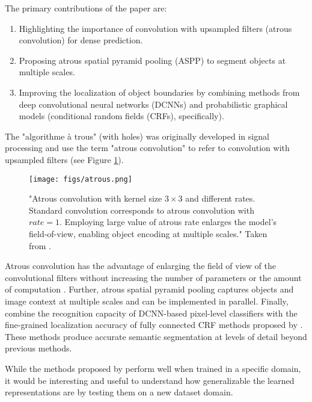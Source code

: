 \documentclass[10pt,twocolumn,letterpaper]{article}
\begin{document}
The primary contributions of the \citet{chen2018deeplab} paper are:
\begin{enumerate}
  \item Highlighting the importance of convolution with upsampled filters (atrous convolution) for dense prediction.
  \item Proposing atrous spatial pyramid pooling (ASPP) to segment objects at multiple scales.
  \item Improving the localization of object boundaries by combining methods from deep convolutional neural networks (DCNNs)
  and probabilistic graphical models (conditional random fields (CRFs), specifically).
\end{enumerate}
 The "algorithme \`a trous" (with holes) was originally developed in signal processing \cite{holschneider1990real} and \citet{chen2018deeplab} use
the term "atrous convolution" to refer to convolution with upsampled filters (see Figure \ref{fig:atrousConv}).

\begin{figure}[H]
  \centering
  \texttt{[image: figs/atrous.png]}
  \caption{"Atrous convolution with kernel size $3\times3$ and different rates.
  Standard convolution corresponds to atrous convolution with $rate = 1$.
  Employing large value of atrous rate enlarges the model’s field-of-view, enabling object encoding at multiple scales." Taken from \citet{chen2017rethinking}.}
  \label{fig:atrousConv}
\end{figure}

Atrous convolution has the advantage of enlarging the field of view of the convolutional filters
without increasing the number of parameters or the amount of computation \cite{chen2018deeplab}.
Further, atrous spatial pyramid pooling captures objects and image context at multiple scales and can be implemented in parallel.
Finally, \citet{chen2018deeplab} combine the recognition capacity of DCNN-based pixel-level classifiers with the
fine-grained localization accuracy of fully connected CRF methods proposed by \cite{krahenbuhl2011efficient}.
These methods produce accurate semantic segmentation at levels of detail beyond previous methods.

While the methods proposed by \citet{chen2018deeplab} perform well when trained in a specific domain,
it would be interesting and useful to understand how generalizable the
learned representations are by testing them on a new dataset domain.
\end{document}
